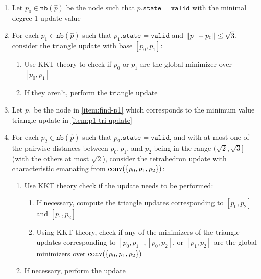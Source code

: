 \documentclass[eikonal.tex]{subfiles}
\begin{document}
\begin{mdframed}
  \begin{enumerate}[nolistsep]
  \item Let $p_0 \in \texttt{nb}(\hat{p})$ be the node such that
    $p\texttt{.state} = \texttt{valid}$ with the minimal degree 1 update
    value \label{item:find-p0}
  \item For each $p_1 \in \texttt{nb}(\hat{p})$ such that
    $p_1\texttt{.state} = \texttt{valid}$ and
    $\left\|p_1 - p_0\right\| \leq \sqrt{3}$, consider the triangle update
    with base $[p_0, p_1]$:
    \begin{enumerate}[nolistsep]
    \item Use KKT theory to check if $p_0$ or $p_1$ are the global
      minimizer over $[p_0, p_1]$\label{item:kkt-tri}
    \item If they aren't, perform the triangle
      update\label{item:p1-tri-update}
    \end{enumerate}\label{item:find-p1}
  \item Let $p_1$ be the node in \cref{item:find-p1} which corresponds
    to the minimum value triangle update in \cref{item:p1-tri-update}
  \item For each $p_2 \in \texttt{nb}(\hat{p})$ such that
    $p_2\texttt{.state} = \texttt{valid}$, and with at most one of the
    pairwise distances between $p_0, p_1$, and $p_2$ being in the
    range $(\sqrt{2}, \sqrt{3}]$ (with the others at most $\sqrt{2}$),
    consider the tetrahedron update with characteristic emanating from
    $\operatorname{conv}(\{p_0, p_1, p_2\})$:
    \begin{enumerate}[nolistsep]
    \item Use KKT theory check if the update needs to be performed:
      \begin{enumerate}[nolistsep]
      \item If necessary, compute the triangle updates corresponding
        to $[p_0, p_2]$ and $[p_1, p_2]$
      \item Using KKT theory, check if any of the minimizers of the
        triangle updates corresponding to $[p_0, p_1], [p_0, p_2]$, or
        $[p_1, p_2]$ are the global minimizers over
        $\operatorname{conv}(\{p_0, p_1, p_2\})$\label{item:kkt-tetra}
      \end{enumerate}
    \item If necessary, perform the update
    \end{enumerate}
  \end{enumerate}
\end{mdframed}
\end{document}
